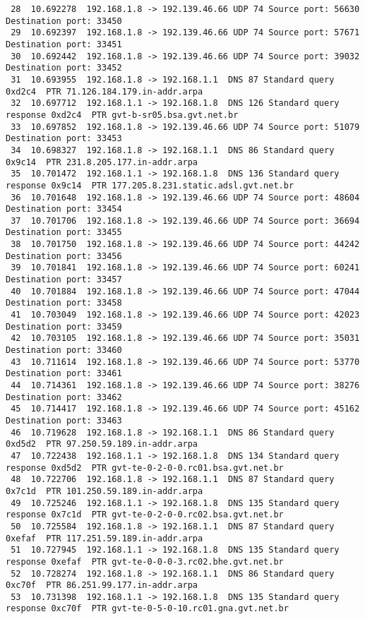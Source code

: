\documentclass[a4paper]{report} %
\begin{document}
\begin{lstlisting}
 28  10.692278  192.168.1.8 -> 192.139.46.66 UDP 74 Source port: 56630  Destination port: 33450
 29  10.692397  192.168.1.8 -> 192.139.46.66 UDP 74 Source port: 57671  Destination port: 33451
 30  10.692442  192.168.1.8 -> 192.139.46.66 UDP 74 Source port: 39032  Destination port: 33452
 31  10.693955  192.168.1.8 -> 192.168.1.1  DNS 87 Standard query 0xd2c4  PTR 71.126.184.179.in-addr.arpa
 32  10.697712  192.168.1.1 -> 192.168.1.8  DNS 126 Standard query response 0xd2c4  PTR gvt-b-sr05.bsa.gvt.net.br
 33  10.697852  192.168.1.8 -> 192.139.46.66 UDP 74 Source port: 51079  Destination port: 33453
 34  10.698327  192.168.1.8 -> 192.168.1.1  DNS 86 Standard query 0x9c14  PTR 231.8.205.177.in-addr.arpa
 35  10.701472  192.168.1.1 -> 192.168.1.8  DNS 136 Standard query response 0x9c14  PTR 177.205.8.231.static.adsl.gvt.net.br
 36  10.701648  192.168.1.8 -> 192.139.46.66 UDP 74 Source port: 48604  Destination port: 33454
 37  10.701706  192.168.1.8 -> 192.139.46.66 UDP 74 Source port: 36694  Destination port: 33455
 38  10.701750  192.168.1.8 -> 192.139.46.66 UDP 74 Source port: 44242  Destination port: 33456
 39  10.701841  192.168.1.8 -> 192.139.46.66 UDP 74 Source port: 60241  Destination port: 33457
 40  10.701884  192.168.1.8 -> 192.139.46.66 UDP 74 Source port: 47044  Destination port: 33458
 41  10.703049  192.168.1.8 -> 192.139.46.66 UDP 74 Source port: 42023  Destination port: 33459
 42  10.703105  192.168.1.8 -> 192.139.46.66 UDP 74 Source port: 35031  Destination port: 33460
 43  10.711614  192.168.1.8 -> 192.139.46.66 UDP 74 Source port: 53770  Destination port: 33461
 44  10.714361  192.168.1.8 -> 192.139.46.66 UDP 74 Source port: 38276  Destination port: 33462
 45  10.714417  192.168.1.8 -> 192.139.46.66 UDP 74 Source port: 45162  Destination port: 33463
 46  10.719628  192.168.1.8 -> 192.168.1.1  DNS 86 Standard query 0xd5d2  PTR 97.250.59.189.in-addr.arpa
 47  10.722438  192.168.1.1 -> 192.168.1.8  DNS 134 Standard query response 0xd5d2  PTR gvt-te-0-2-0-0.rc01.bsa.gvt.net.br
 48  10.722706  192.168.1.8 -> 192.168.1.1  DNS 87 Standard query 0x7c1d  PTR 101.250.59.189.in-addr.arpa
 49  10.725246  192.168.1.1 -> 192.168.1.8  DNS 135 Standard query response 0x7c1d  PTR gvt-te-0-2-0-0.rc02.bsa.gvt.net.br
 50  10.725584  192.168.1.8 -> 192.168.1.1  DNS 87 Standard query 0xefaf  PTR 117.251.59.189.in-addr.arpa
 51  10.727945  192.168.1.1 -> 192.168.1.8  DNS 135 Standard query response 0xefaf  PTR gvt-te-0-0-0-3.rc02.bhe.gvt.net.br
 52  10.728274  192.168.1.8 -> 192.168.1.1  DNS 86 Standard query 0xc70f  PTR 86.251.99.177.in-addr.arpa
 53  10.731398  192.168.1.1 -> 192.168.1.8  DNS 135 Standard query response 0xc70f  PTR gvt-te-0-5-0-10.rc01.gna.gvt.net.br

\end{lstlisting}
\end{document}

